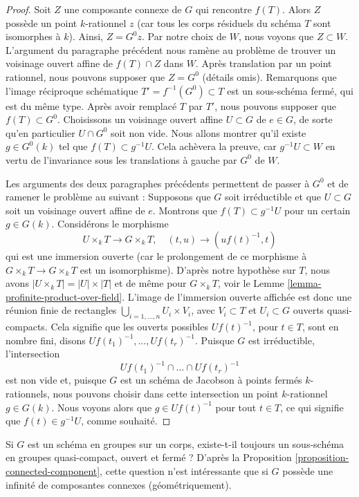 \begin{proof}
\medskip\noindent
Soit $Z$ une composante connexe de $G$ qui rencontre $f(T)$. Alors $Z$
possède un point $k$-rationnel $z$ (car tous les corps résiduels du schéma $T$
sont isomorphes à $k$). Ainsi, $Z = G^0 z$. Par notre choix de $W$, nous voyons
que $Z \subset W$. L'argument du paragraphe précédent nous ramène
au problème de trouver un voisinage ouvert affine de $f(T) \cap Z$ dans $W$.
Après translation par un point rationnel, nous pouvons supposer que $Z = G^0$
(détails omis). Remarquons que l'image réciproque schématique
$T' = f^{-1}(G^0) \subset T$ est un sous-schéma fermé, qui est du même type.
Après avoir remplacé $T$ par $T'$, nous pouvons supposer que $f(T) \subset G^0$.
Choisissons un voisinage ouvert affine $U \subset G$
de $e \in G$, de sorte qu'en particulier $U \cap G^0$ soit non vide. Nous allons montrer
qu'il existe $g \in G^0(k)$ tel que $f(T) \subset g^{-1}U$.
Cela achèvera la preuve, car $g^{-1}U \subset W$ en vertu de l'invariance
sous les translations à gauche par $G^0$ de $W$.

\medskip\noindent
Les arguments des deux paragraphes précédents permettent de passer à $G^0$
et de ramener le problème au suivant :
Supposons que $G$ soit irréductible et que $U \subset G$ soit un
voisinage ouvert affine de $e$. Montrons que $f(T) \subset g^{-1}U$
pour un certain $g \in G(k)$. Considérons le morphisme
$$
U \times_k T \longrightarrow G \times_k T,\quad
(t, u) \longrightarrow (uf(t)^{-1}, t)
$$
qui est une immersion ouverte (car le prolongement de ce morphisme à
$G \times_k T \to G \times_k T$ est un isomorphisme).
D'après notre hypothèse sur $T$, nous avons $|U \times_k T| = |U| \times |T|$
et de même pour $G \times_k T$, voir
le Lemme \ref{lemma-profinite-product-over-field}.
L'image de l'immersion ouverte affichée est donc une réunion finie
de rectangles $\bigcup_{i = 1, \ldots, n} U_i \times V_i$, avec
$V_i \subset T$ et $U_i \subset G$ ouverts quasi-compacts. Cela signifie que
les ouverts possibles $Uf(t)^{-1}$, pour $t \in T$, sont en nombre fini, disons
$Uf(t_1)^{-1}, \ldots, Uf(t_r)^{-1}$. Puisque $G$ est irréductible,
l'intersection
$$
Uf(t_1)^{-1} \cap \ldots \cap Uf(t_r)^{-1}
$$
est non vide et, puisque $G$ est un schéma de Jacobson à points fermés $k$-rationnels,
nous pouvons choisir dans cette intersection un point $k$-rationnel $g \in G(k)$.
Nous voyons alors que $g \in Uf(t)^{-1}$ pour tout $t \in T$, ce qui
signifie que $f(t) \in g^{-1}U$, comme souhaité.
\end{proof}

\begin{remark}
\label{remark-easy}
Si $G$ est un schéma en groupes sur un corps, existe-t-il toujours un sous-schéma en groupes quasi-compact,
ouvert et fermé ? D'après la
Proposition \ref{proposition-connected-component},
cette question n'est intéressante que si $G$ possède une infinité de composantes connexes
(géométriquement).
\end{remark}

